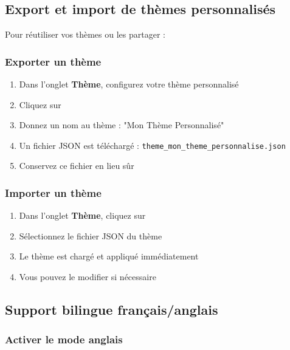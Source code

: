 \subsection{Export et import de thèmes personnalisés}

Pour réutiliser vos thèmes ou les partager :

\subsubsection{Exporter un thème}

\begin{enumerate}[leftmargin=*]
    \item Dans l'onglet \textbf{Thème}, configurez votre thème personnalisé
    \item Cliquez sur 
    \item Donnez un nom au thème : "Mon Thème Personnalisé"
    \item Un fichier JSON est téléchargé : \texttt{theme\_mon\_theme\_personnalise.json}
    \item Conservez ce fichier en lieu sûr
\end{enumerate}

\subsubsection{Importer un thème}

\begin{enumerate}[leftmargin=*]
    \item Dans l'onglet \textbf{Thème}, cliquez sur 
    \item Sélectionnez le fichier JSON du thème
    \item Le thème est chargé et appliqué immédiatement
    \item Vous pouvez le modifier si nécessaire
\end{enumerate}


\subsection{Support bilingue français/anglais}

\subsubsection{Activer le mode anglais}


